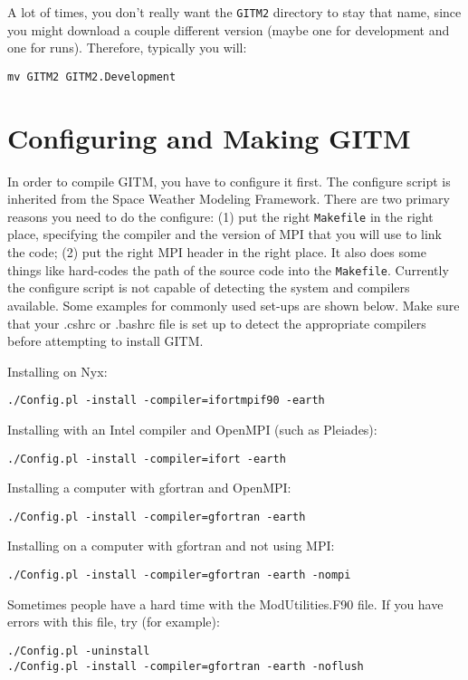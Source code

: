 A lot of times, you don't really want the {\tt GITM2} directory to
stay that name, since you might download a couple different version
(maybe one for development and one for runs).  Therefore, typically
you will:
\begin{verbatim}
mv GITM2 GITM2.Development
\end{verbatim}

\section{Configuring and Making GITM}

In order to compile GITM, you have to configure it first.  The
configure script is inherited from the Space Weather Modeling
Framework.  There are two primary reasons you need to do the
configure: (1) put the right {\tt Makefile} in the right place,
specifying the compiler and the version of MPI that you will use to
link the code; (2) put the right MPI header in the right place.  It
also does some things like hard-codes the path of the source code into
the {\tt Makefile}. Currently the configure script is not capable of detecting the system and compilers available.  Some examples for commonly used set-ups are shown below.  Make sure that your .cshrc or .bashrc file is set up to detect the appropriate compilers before attempting to install GITM.

Installing on Nyx:
\begin{verbatim}
./Config.pl -install -compiler=ifortmpif90 -earth
\end{verbatim}

Installing with an Intel compiler and OpenMPI (such as Pleiades):
\begin{verbatim}
./Config.pl -install -compiler=ifort -earth
\end{verbatim}

Installing a computer with gfortran and OpenMPI:
\begin{verbatim}
./Config.pl -install -compiler=gfortran -earth
\end{verbatim}

Installing on a computer with gfortran and not using MPI:
\begin{verbatim}
./Config.pl -install -compiler=gfortran -earth -nompi
\end{verbatim}

Sometimes people have a hard time with the ModUtilities.F90 file.  If
you have errors with this file, try (for example):
\begin{verbatim}
./Config.pl -uninstall
./Config.pl -install -compiler=gfortran -earth -noflush
\end{verbatim}

